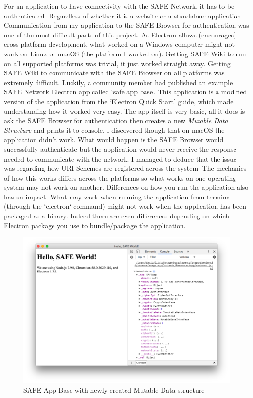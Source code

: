 For an application to have connectivity with the SAFE Network, it has to be authenticated. Regardless of whether it is a website or a standalone application. Communication from my application to the SAFE Browser for authentication was one of the most difficult parts of this project. As Electron allows (encourages) cross-platform development, what worked on a Windows computer might not work on Linux or macOS (the platform I worked on). Getting SAFE Wiki to run on all supported platforms was trivial, it just worked straight away. Getting SAFE Wiki to communicate with the SAFE Browser on all platforms was extremely difficult. Luckily, a community member had published an example SAFE Network Electron app called `safe app base'\cite{safe-app-base}. This application is a modified version of the application from the `Electron Quick Start' guide\cite{electron-quick-start}, which made understanding how it worked very easy. The app itself is very basic, all it does is ask the SAFE Browser for authentication then creates a new \textit{Mutable Data Structure} and prints it to console. I discovered though that on macOS the application didn't work. What would happen is the SAFE Browser would successfully authenticate but the application would never receive the response needed to communicate with the network. I managed to deduce that the issue was regarding how URI Schemes are registered across the system. The mechanics of how this works differs across the platforms so what works on one operating system may not work on another. Differences on how you run the application also has an impact. What may work when running the application from terminal (through the `electron` command) might not work when the application has been packaged as a binary. Indeed there are even differences depending on which Electron package you use to bundle/package the application.

\begin{figure}
	\begin{center}
		\includegraphics{images/safe-app-base}
		\caption{SAFE App Base with newly created Mutable Data structure}
		\label{fig:safe-app-base}
	\end{center}
\end{figure}

